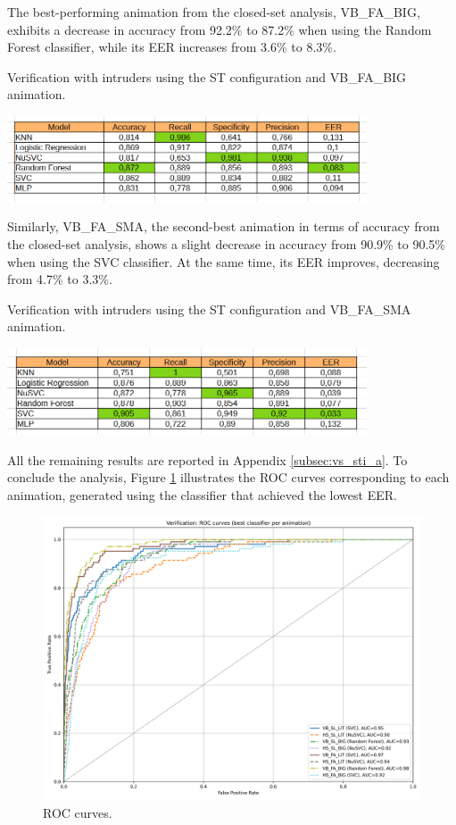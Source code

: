 \documentclass[12pt]{report}
\begin{document}
The best-performing animation from the closed-set analysis, VB\_FA\_BIG, exhibits a decrease in accuracy from 92.2\% to 87.2\% when using the Random Forest classifier, while its EER increases from 3.6\% to 8.3\%.

\begin{table}[ht]
    \centering
    \caption{Verification with intruders using the ST configuration and VB\_FA\_BIG animation.}
    \includegraphics[width=0.8\textwidth]{Images/Results/Verification_single_intruders/st/VB_FA_BIG.png}
    \label{tab:VB_FA_BIG_sti}
\end{table}

Similarly, VB\_FA\_SMA, the second-best animation in terms of accuracy from the closed-set analysis, shows a slight decrease in accuracy from 90.9\% to 90.5\% when using the SVC classifier.
At the same time, its EER improves, decreasing from 4.7\% to 3.3\%.

\begin{table}[ht]
    \centering
    \caption{Verification with intruders using the ST configuration and VB\_FA\_SMA animation.}
    \includegraphics[width=0.8\textwidth]{Images/Results/Verification_single_intruders/st/VB_FA_LIT.png}
    \label{tab:VB_FA_LIT_sti}
\end{table}

All the remaining results are reported in Appendix \ref{subsec:vs_sti_a}.
To conclude the analysis, Figure \ref{fig:roc_sti} illustrates the ROC curves corresponding to each animation, generated using the classifier that achieved the lowest EER.


\begin{figure}[ht]
    \centering
    \includegraphics[width = 0.6
    \textwidth]{Images/Results/Verification_single_intruders/st/best_animation_roc_curves_st.png}
    \caption{ROC curves.}
    \label{fig:roc_sti}
\end{figure}
\FloatBarrier
\end{document}
